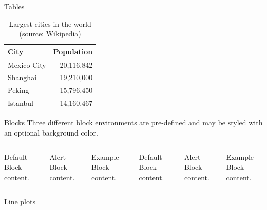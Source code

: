 \begin{frame}{Tables}
	\begin{table}
		\caption{Largest cities in the world (source: Wikipedia)}
		\begin{tabular}{@{} lr @{}}
			\toprule
			City & Population\\
			\midrule
			Mexico City & 20,116,842\\
			Shanghai & 19,210,000\\
			Peking & 15,796,450\\
			Istanbul & 14,160,467\\
			\bottomrule
		\end{tabular}
	\end{table}
\end{frame}

\begin{frame}{Blocks}
	Three different block environments are pre-defined and may be styled with an
	optional background color.
	
	\begin{columns}[T,onlytextwidth]
		\begin{block}{Default}
			Block content.
		\end{block}
		
		\begin{alertblock}{Alert}
			Block content.
		\end{alertblock}
		
		\begin{exampleblock}{Example}
			Block content.
		\end{exampleblock}
		
		
		
		\begin{block}{Default}
			Block content.
		\end{block}
		
		\begin{alertblock}{Alert}
			Block content.
		\end{alertblock}
		
		\begin{exampleblock}{Example}
			Block content.
		\end{exampleblock}
		
	\end{columns}
\end{frame}

\begin{frame}{Line plots}
	\begin{figure}
	\end{figure}
\end{frame}

